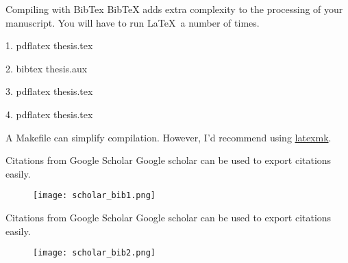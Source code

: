 \begin{frame}{Compiling with BibTex}
BibTeX adds extra complexity to the processing of your manuscript. You will
have to run \LaTeX\ a number of times.

\alert{1.} pdflatex thesis.tex

\alert{2.} bibtex thesis.\alert{aux}

\alert{3.} pdflatex thesis.tex

\alert{4.} pdflatex thesis.tex

A Makefile can simplify compilation. However, I'd recommend using
\href{https://ctan.org/pkg/latexmk?lang=en}{latexmk}.
\end{frame}

\begin{frame}{Citations from Google Scholar}
Google scholar can be used to export citations easily.
  \begin{figure}
  	\centering
  	\texttt{[image: scholar\_bib1.png]}
  \end{figure}
\end{frame}

\begin{frame}{Citations from Google Scholar}
Google scholar can be used to export citations easily.
  \begin{figure}
  	\centering
  	\texttt{[image: scholar\_bib2.png]}
  \end{figure}
\end{frame}

